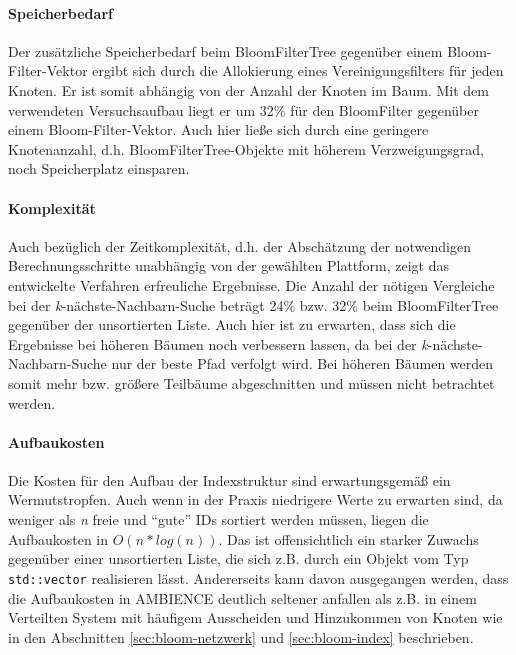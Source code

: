\paragraph*{Speicherbedarf}
Der zusätzliche Speicherbedarf beim BloomFilterTree gegenüber einem Bloom-Filter-Vektor ergibt sich durch die Allokierung eines Vereinigungsfilters für jeden Knoten. Er ist somit abhängig von der Anzahl der Knoten im Baum. Mit dem verwendeten Versuchsaufbau liegt er um 32\% für den BloomFilter gegenüber einem Bloom-Filter-Vektor. Auch hier ließe sich durch eine geringere Knotenanzahl, d.h. BloomFilterTree-Objekte mit höherem Verzweigungsgrad, noch Speicherplatz einsparen. 
\paragraph*{Komplexität}
Auch bezüglich der Zeitkomplexität, d.h. der Abschätzung der notwendigen Berechnungsschritte unabhängig von der gewählten Plattform, zeigt das entwickelte Verfahren erfreuliche Ergebnisse. Die Anzahl der nötigen Vergleiche bei der \textit{k}-nächste-Nachbarn-Suche beträgt 24\% bzw. 32\% beim BloomFilterTree gegenüber der unsortierten Liste. Auch hier ist zu erwarten, dass sich die Ergebnisse bei höheren Bäumen noch verbessern lassen, da bei der \textit{k}-nächste-Nachbarn-Suche nur der beste Pfad verfolgt wird. Bei höheren Bäumen werden somit mehr bzw. größere Teilbäume abgeschnitten und müssen nicht betrachtet werden. 
\paragraph*{Aufbaukosten}
Die Kosten für den Aufbau der Indexstruktur sind erwartungsgemäß ein Wermutstropfen. Auch wenn in der Praxis niedrigere Werte zu erwarten sind, da weniger als \textit{n} freie und "`gute"' IDs sortiert werden müssen, liegen die Aufbaukosten in $O(n\ast log(n))$. Das ist offensichtlich ein starker Zuwachs gegenüber einer unsortierten Liste, die sich z.B. durch ein Objekt vom Typ \texttt{std::vector} realisieren lässt. Andererseits kann davon ausgegangen werden, dass die Aufbaukosten in AMBIENCE deutlich seltener anfallen als z.B. in einem Verteilten System mit häufigem Ausscheiden und Hinzukommen von Knoten wie in den Abschnitten \ref{sec:bloom-netzwerk} und \ref{sec:bloom-index} beschrieben.